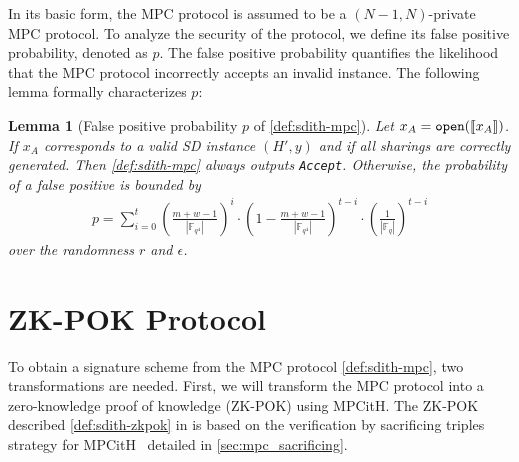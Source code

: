 \documentclass[11pt]{report}
\theoremstyle{definition}
\theoremstyle{plain}
\newtheorem{lemma}{Lemma}[section]
\begin{document}
In its basic form, the MPC protocol is assumed to be a $(N-1, N)$-private MPC protocol. To analyze the security of the protocol, we define its false positive probability, denoted as $p$. The false positive probability quantifies the likelihood that the MPC protocol incorrectly accepts an invalid instance. The following lemma formally characterizes $p$:


\begin{lemma}[False positive probability $p$ of \autoref{def:sdith-mpc}]
  Let $x_A = \texttt{open}(\llbracket x_A \rrbracket)$. If $x_A$ corresponds to a valid SD instance $(H', y)$ and if all sharings are correctly generated. Then \autoref{def:sdith-mpc} always outputs \texttt{Accept}.
  Otherwise, the probability of a false positive is bounded by
  \begin{align*}
    p = \sum_{i=0}^t \left(\frac{m + w - 1}{|\mathbb{F}_{q^4}|}\right)^i \cdot \left(1 - \frac{m + w - 1}{|\mathbb{F}_{q^4}|}\right)^{t-i} \cdot \left(\frac{1}{|\mathbb{F}_q|}\right)^{t-i}
  \end{align*} over the randomness $r$ and $\epsilon$.
\end{lemma}

\section{ZK-POK Protocol}

To obtain a signature scheme from the MPC protocol \autoref{def:sdith-mpc}, two transformations are needed. First, we will transform the MPC protocol into a zero-knowledge proof of knowledge (ZK-POK) using MPCitH. The ZK-POK described \autoref{def:sdith-zkpok} in is based on the verification by sacrificing triples strategy for MPCitH~\cite{baum2020concretely} detailed in \autoref{sec:mpc_sacrificing}. 
\end{document}
